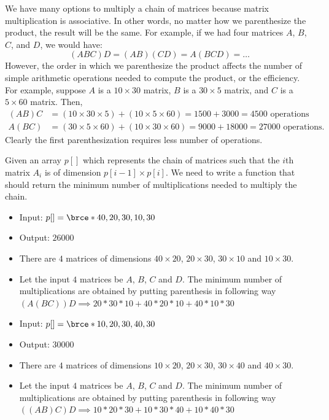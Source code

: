 We have many options to multiply a chain of matrices because matrix
multiplication is associative. In other words, no matter how we parenthesize
the product, the result will be the same. For example, if we had four
matrices $A$, $B$, $C$, and $D$, we would have:
\begin{equation*}
(ABC)D = (AB)(CD) = A(BCD) = \ldots
\end{equation*}
However, the order in which we parenthesize the product affects the number
of simple arithmetic operations needed to compute the product, or the
efficiency. For example, suppose $A$ is a $10\times30$ matrix, $B$ is a
$30\times5$ matrix, and $C$ is a $5\times60$ matrix. Then,
\begin{align*}
(AB)C&=
(10\times30\times5)+(10\times5\times60)=1500+3000=4500 \text{ operations}\\
A(BC)&=
(30\times5\times60)+(10\times30\times60)=9000+18000=27000 \text{ operations}.
\end{align*}
Clearly the first parenthesization requires less number of operations.

Given an array $p[]$ which represents the chain of matrices such that the
$i$th matrix $A_i$ is of dimension $p[i-1]\times p[i]$. We need to write a
function  that should return the minimum number of
multiplications needed to multiply the chain.

\begin{itemize}[noitemsep,topsep=0pt]
\item Input: $p[]=\brce*{40,20,30,10,30}$
\item Output: $26000$
\item There are $4$ matrices of dimensions $40\times20$, $20\times30$,
  $30\times10$ and $10\times30$.
\item Let the input $4$ matrices be $A$, $B$, $C$ and $D$. The minimum
  number of multiplications are obtained by putting parenthesis in following
  way $(A(BC))D \implies 20*30*10 + 40*20*10 + 40*10*30$
\end{itemize}

\begin{itemize}[noitemsep,topsep=0pt]
\item Input: $p[]=\brce*{10,20,30,40,30}$
\item Output: $30000$
\item There are $4$ matrices of dimensions $10\times20$, $20\times30$,
  $30\times40$ and $40\times30$.
\item Let the input $4$ matrices be $A$, $B$, $C$ and $D$. The minimum
  number of multiplications are obtained by putting parenthesis in following
  way $((AB)C)D \implies 10*20*30 + 10*30*40 + 10*40*30$
\end{itemize}

